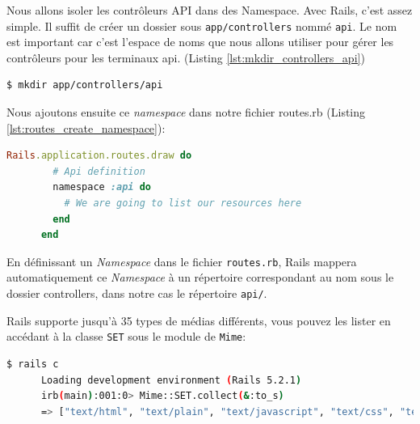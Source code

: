 \documentclass[]{report}
\begin{document}
      Nous allons isoler les contrôleurs API dans des Namespace. Avec Rails, c'est assez simple. Il suffit de créer un dossier sous \verb|app/controllers| nommé \verb|api|. Le nom est important car c'est l'espace de noms que nous allons utiliser pour gérer les contrôleurs pour les terminaux api. (Listing \ref{lst:mkdir_controllers_api})

      \begin{scriptsize}
      \begin{lstlisting}[language=bash, caption={Commande pour créer le dossier controllers/api}, label={lst:mkdir_controllers_api}]
      $ mkdir app/controllers/api
      \end{lstlisting}
      \end{scriptsize}

      Nous ajoutons ensuite ce \textit{namespace} dans notre fichier routes.rb (Listing \ref{lst:routes_create_namespace}):

      \begin{scriptsize}
      \begin{lstlisting}[language=ruby, caption={Création d'un Namespace}, label={lst:routes_create_namespace}]
      Rails.application.routes.draw do
        # Api definition
        namespace :api do
          # We are going to list our resources here
        end
      end
      \end{lstlisting}
      \end{scriptsize}

      En définissant un \textit{Namespace} dans le fichier \verb|routes.rb|, Rails mappera automatiquement ce \textit{Namespace} à un répertoire correspondant au nom sous le dossier controllers, dans notre cas le répertoire \verb|api/|.

      Rails supporte jusqu'à 35 types de médias différents, vous pouvez les lister en accédant à la classe \verb|SET| sous le module de \verb|Mime|:


      \begin{scriptsize}
      \begin{lstlisting}[language=bash]
      $ rails c
      Loading development environment (Rails 5.2.1)
      irb(main):001:0> Mime::SET.collect(&:to_s)
      => ["text/html", "text/plain", "text/javascript", "text/css", "text/calendar", "text/csv", "text/vcard", "text/vtt", "image/png", "image/jpeg", "image/gif", "image/bmp", "image/tiff", "image/svg+xml", "video/mpeg", "audio/mpeg", "audio/ogg", "audio/aac", "video/webm", "video/mp4", "font/otf", "font/ttf", "font/woff", "font/woff2", "application/xml", "application/rss+xml", "application/atom+xml", "application/x-yaml", "multipart/form-data", "application/x-www-form-urlencoded", "application/json", "application/pdf", "application/zip", "application/gzip", "application/vnd.web-console.v2"]
      \end{lstlisting}
      \end{scriptsize}
\end{document}

